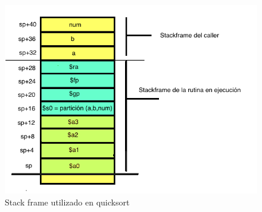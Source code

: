 \documentclass[a4paper,10pt]{article}
\numberwithin{equation}{section}
\numberwithin{figure}{section}
\begin{document}
\begin{figure}[h]
  \centering
    \includegraphics[width=1\textwidth]{quicksort_stack.png}
  \caption{Stack frame utilizado en quicksort}
  \label{fig:stack}
\end{figure}
\end{document}
